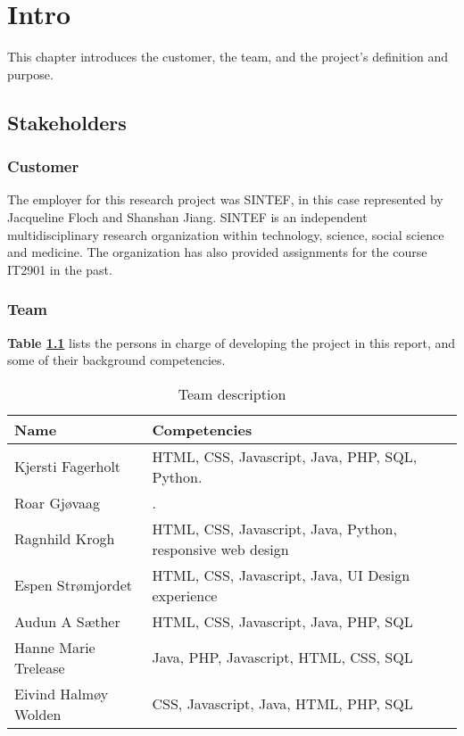 
\chapter{Intro}

This chapter introduces the customer, the team, and the project’s definition and purpose.

\section{Stakeholders}

\subsection{Customer}

The employer for this research project was SINTEF, in this case represented by Jacqueline Floch and Shanshan Jiang. SINTEF is an independent multidisciplinary research organization within technology, science, social science and medicine. The organization has also provided assignments for the course IT2901 in the past.

\subsection{Team}

\textbf{Table \ref{Tab_team}} lists the persons in charge of developing the project in this report, and some of their background competencies.

\begin{table}[!h]
	\begin{center}
		\begin{tabular}{ | l | l |}
			\hline
			\textbf{Name} & \textbf{Competencies} \\ \hline
			Kjersti Fagerholt & HTML, CSS, Javascript, Java, PHP, SQL, Python. \\ \hline
			Roar Gjøvaag & . \\ \hline
			Ragnhild Krogh & HTML, CSS, Javascript, Java, Python, responsive web design \\ \hline
			Espen Strømjordet & HTML, CSS, Javascript, Java,
			UI Design experience \\ \hline
			Audun A Sæther & HTML, CSS, Javascript, Java, PHP, SQL \\ \hline
			Hanne Marie Trelease & Java, PHP, Javascript, HTML, CSS, SQL \\ \hline
			Eivind Halmøy Wolden & CSS, Javascript, Java, HTML, PHP, SQL \\ \hline
		\end{tabular}
	\end{center}
	\caption{Team description}
	\label{Tab_team}
\end{table}

